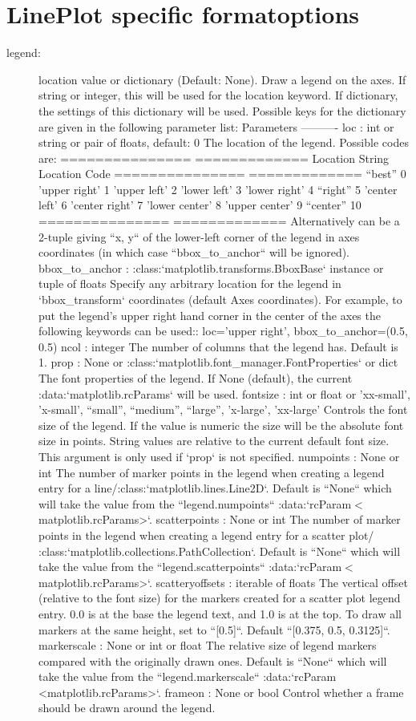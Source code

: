 \section{LinePlot specific formatoptions}
\begin{description}
    \item[\gls*{legend}:] \label{item:legend}  location value or dictionary (Default: None). Draw a legend on the axes. If string or integer, this will be used for the location keyword. If dictionary, the settings of this dictionary will be used. Possible keys for the dictionary are given in the following parameter list: Parameters ---------- loc : int or string or pair of floats, default: 0 The location of the legend. Possible codes are: =============== ============= Location String Location Code =============== ============= \enquote{best} 0 'upper right' 1 'upper left' 2 'lower left' 3 'lower right' 4 \enquote{right} 5 'center left' 6 'center right' 7 'lower center' 8 'upper center' 9 \enquote{center} 10 =============== ============= Alternatively can be a 2-tuple giving ``x, y`` of the lower-left corner of the legend in axes coordinates (in which case ``bbox\_to\_anchor`` will be ignored). bbox\_to\_anchor : :class:`matplotlib.transforms.BboxBase` instance or tuple of floats Specify any arbitrary location for the legend in `bbox\_transform` coordinates (default Axes coordinates). For example, to put the legend's upper right hand corner in the center of the axes the following keywords can be used:: loc='upper right', bbox\_to\_anchor=(0.5, 0.5) ncol : integer The number of columns that the legend has. Default is 1. prop : None or :class:`matplotlib.font\_manager.FontProperties` or dict The font properties of the legend. If None (default), the current :data:`matplotlib.rcParams` will be used. fontsize : int or float or {'xx-small', 'x-small', \enquote{small}, \enquote{medium}, \enquote{large}, 'x-large', 'xx-large'} Controls the font size of the legend. If the value is numeric the size will be the absolute font size in points. String values are relative to the current default font size. This argument is only used if `prop` is not specified. numpoints : None or int The number of marker points in the legend when creating a legend entry for a line/:class:`matplotlib.lines.Line2D`. Default is ``None`` which will take the value from the ``legend.numpoints`` :data:`rcParam$<$matplotlib.rcParams>`. scatterpoints : None or int The number of marker points in the legend when creating a legend entry for a scatter plot/ :class:`matplotlib.collections.PathCollection`. Default is ``None`` which will take the value from the ``legend.scatterpoints`` :data:`rcParam$<$matplotlib.rcParams>`. scatteryoffsets : iterable of floats The vertical offset (relative to the font size) for the markers created for a scatter plot legend entry. 0.0 is at the base the legend text, and 1.0 is at the top. To draw all markers at the same height, set to ``[0.5]``. Default ``[0.375, 0.5, 0.3125]``. markerscale : None or int or float The relative size of legend markers compared with the originally drawn ones. Default is ``None`` which will take the value from the ``legend.markerscale`` :data:`rcParam <matplotlib.rcParams>`. frameon : None or bool Control whether a frame should be drawn around the legend. 
\end{description}
